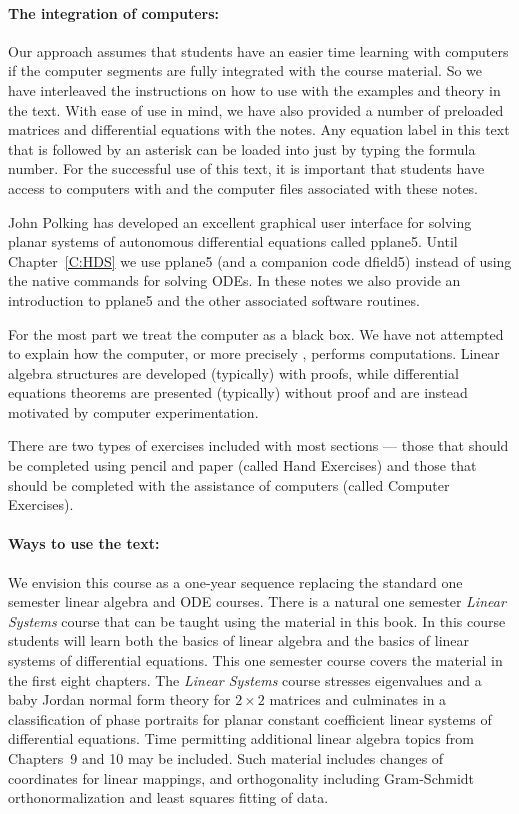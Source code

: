 \documentclass{ximera}
\begin{document}
\paragraph{The integration of computers:}  Our approach assumes that students 
have an easier time learning with 
computers if the computer segments are fully integrated with the course 
material.  So we have interleaved the instructions on how to use \Matlab 
with the examples and theory in the text.  With ease of use in mind, we 
have also provided a number of preloaded matrices and differential equations 
with the notes.  Any equation label in this text that is followed by an 
asterisk can be loaded into \Matlab just by typing the formula number.  For 
the successful use of this text, it is important that students have access 
to computers with \Matlab and the computer files associated with these notes.

John Polking has developed an excellent graphical user interface for solving
planar systems of autonomous differential equations called {\sf pplane5}.  
Until Chapter~\ref{C:HDS} we use {\sf pplane5} (and a companion code 
{\sf dfield5}) instead of using the \Matlab native commands for solving ODEs. 
In these notes we also provide an introduction to {\sf pplane5} and the other 
associated software routines.

For the most part we treat the computer as a black box.  We have not
attempted to explain how the computer, or more precisely \Matlabp, 
performs computations.   Linear algebra structures are developed (typically) 
with proofs, while differential equations theorems are presented (typically) 
without proof and are instead motivated by computer experimentation.  

There are two types of exercises included with most sections --- those that 
should be completed using pencil and paper (called Hand Exercises) and 
those that should be completed with the assistance of computers (called 
Computer Exercises).  

\paragraph{Ways to use the text:}  We envision this course as a one-year 
sequence replacing the standard one semester linear algebra and ODE courses. 
There is a natural one semester {\em Linear Systems\/} course that can be 
taught using the material in this book. In this course students will
learn both the basics of linear algebra and the basics of linear systems of
differential equations.  This one semester course covers the material in the 
first eight chapters.  The {\em Linear Systems\/} course stresses eigenvalues 
and a baby Jordan normal form theory for $2\times 2$ matrices and culminates 
in a classification of phase portraits for planar constant coefficient linear 
systems of differential equations.   Time permitting additional linear 
algebra topics from Chapters~9 and 10 may be included.  Such material 
includes changes of coordinates for linear mappings, and orthogonality 
including Gram-Schmidt orthonormalization and least squares fitting of data.
\end{document}
